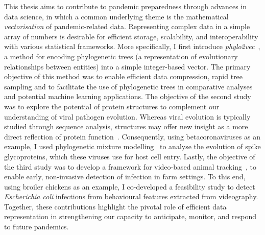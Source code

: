 \newpage

This thesis aims to contribute to pandemic preparedness through advances in data science, in which a common underlying theme is the mathematical \emph{vectorisation} of pandemic-related data. Representing complex data in a simple array of numbers is desirable for efficient storage, scalability, and interoperability with various statistical frameworks. More specifically, I first introduce \emph{phylo2vec}~\cite{penn2025}, a method for encoding phylogenetic trees (a representation of evolutionary relationships between entities) into a simple integer-based vector. The primary objective of this method was to enable efficient data compression, rapid tree sampling and to facilitate the use of phylogenetic trees in comparative analyses and potential machine learning applications. The objective of the second study was to explore the potential of protein structures to complement our understanding of viral pathogen evolution. Whereas viral evolution is typically studied through sequence analysis, structures may offer new insight as a more direct reflection of protein function~\cite{crick1958}. Consequently, using betacoronaviruses as an example, I used phylogenetic mixture modelling~\cite{pagel2005} to analyse the evolution of spike glycoproteins, which these viruses use for host cell entry. Lastly, the objective of the third study was to develop a framework for video-based animal tracking~\cite{scheidwasser2025}, to enable early, non-invasive detection of infection in farm settings. To this end, using broiler chickens as an example, I co-developed a feasibility study to detect \textit{Escherichia coli} infections from behavioural features extracted from videography. Together, these contributions highlight the pivotal role of efficient data representation in strengthening our capacity to anticipate, monitor, and respond to future pandemics.
